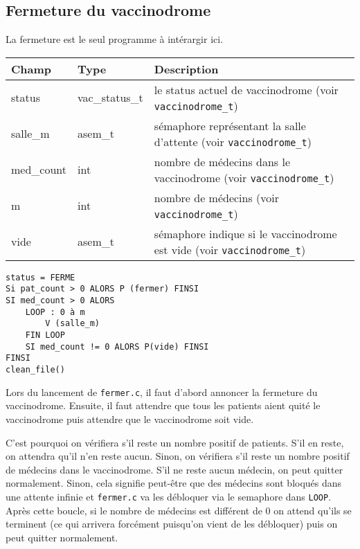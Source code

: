 \documentclass[a4paper]{article}
\begin{document}
\subsection{Fermeture du vaccinodrome}

La fermeture est le seul programme à intérargir ici.
\bigskip \newline
\begin{tabularx}{\linewidth}{|l|l|>{\strut}X|}
  \hline%
  Champ & Type & Description \\ \hline%
  status & vac\_status\_t & le status actuel de vaccinodrome (voir \texttt{vaccinodrome\_t}) \\ \hline%
  salle\_m & asem\_t & sémaphore représentant la salle d'attente (voir \texttt{vaccinodrome\_t}) \\ \hline%
  med\_count & int & nombre de médecins dans le vaccinodrome (voir \texttt{vaccinodrome\_t}) \\ \hline%
  m & int & nombre de médecins (voir \texttt{vaccinodrome\_t}) \\ \hline%
  vide & asem\_t & sémaphore indique si le vaccinodrome est vide (voir \texttt{vaccinodrome\_t}) \\ \hline%
\end{tabularx}

\begin{verbatim}
status = FERME
Si pat_count > 0 ALORS P (fermer) FINSI
SI med_count > 0 ALORS
    LOOP : 0 à m
        V (salle_m)
    FIN LOOP
    SI med_count != 0 ALORS P(vide) FINSI
FINSI
clean_file()
\end{verbatim}

\medskip \par
Lors du lancement de \texttt{fermer.c}, il faut d'abord annoncer la fermeture du vaccinodrome. Ensuite, il faut attendre que tous les patients aient quité le vaccinodrome puis attendre que le vaccinodrome soit vide. 
\medskip \par C'est pourquoi on vérifiera s'il reste un nombre positif de patients. S'il en reste, on attendra qu'il n'en reste aucun. Sinon, on vérifiera s’il reste un nombre positif de médecins dans le vaccinodrome. S'il ne reste aucun médecin, on peut quitter normalement. Sinon, cela signifie peut-être que des médecins sont bloqués dans une attente infinie et \texttt{fermer.c} va les débloquer via le semaphore dans \texttt{LOOP}. Après cette boucle, si le nombre de médecins est différent de 0 on attend qu'ils se terminent (ce qui arrivera forcément puisqu'on vient de les débloquer) puis on peut quitter normalement.
\end{document}
